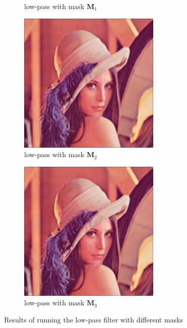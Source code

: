 \documentclass[12pt]{article}
\begin{document}
\begin{figure}[ht]
\begin{subfigure}[t]{\subfiguresize}
        \caption{low-pass with mask $\mathbf{M}_1$}
    \end{subfigure}
    \begin{subfigure}[t]{\subfiguresize}
        \includegraphics[width=\textwidth]{lenac_lowpass2.png}
        \caption{low-pass with mask $\mathbf{M}_2$}
    \end{subfigure}
    \begin{subfigure}[t]{\subfiguresize}
        \includegraphics[width=\textwidth]{lenac_lowpass3.png}
        \caption{low-pass with mask $\mathbf{M}_3$}
    \end{subfigure}
    \caption{Results of running the low-pass filter with different masks}
    \label{fig:lowpass-results-original}
\end{figure}
\end{document}
